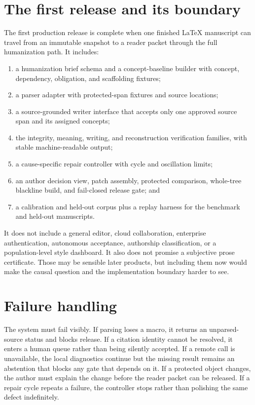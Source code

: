 \section{The first release and its boundary}

The first production release is complete when one finished LaTeX manuscript can
travel from an immutable snapshot to a reader packet through the full
humanization path. It includes:

\begin{enumerate}
\item a humanization brief schema and a concept-baseline builder with concept,
      dependency, obligation, and scaffolding fixtures;
\item a parser adapter with protected-span fixtures and source locations;
\item a source-grounded writer interface that accepts only one approved source
      span and its assigned concepts;
\item the integrity, meaning, writing, and reconstruction verification families,
      with stable machine-readable output;
\item a cause-specific repair controller with cycle and oscillation limits;
\item an author decision view, patch assembly, protected comparison, whole-tree
      blackline build, and fail-closed release gate; and
\item a calibration and held-out corpus plus a replay harness for the benchmark
      and held-out manuscripts.
\end{enumerate}

It does not include a general editor, cloud collaboration, enterprise
authentication, autonomous acceptance, authorship classification, or a
population-level style dashboard. It also does not promise a subjective prose
certificate. Those may be sensible later products, but including them now would
make the causal question and the implementation boundary harder to see.

\section{Failure handling}

The system must fail visibly. If parsing loses a macro, it returns an
unparsed-source status and blocks release. If a citation identity cannot be
resolved, it enters a human queue rather than being silently accepted. If a
remote call is unavailable, the local diagnostics continue but the missing
result remains an abstention that blocks any gate that depends on it. If a
protected object changes, the author must explain the change before the reader
packet can be released. If a repair cycle repeats a failure, the controller
stops rather than polishing the same defect indefinitely.

